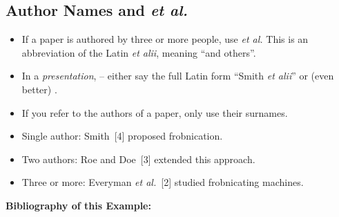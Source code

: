 \documentclass[11pt,a4paper]{article}
\begin{document}
\subsection{Author Names and \emph{et al.}}
\label{sec-author-names-et-al}

\begin{itemize}
    \item If a paper is authored by three or more people, use \emph{et al.} This is an abbreviation of the Latin \emph{et alii}, meaning ``and others''.
    \item In a \emph{presentation},  -- either say the full Latin form ``Smith \emph{et alii}'' or (even better) .
    \item If you refer to the authors of a paper, only use their surnames.
\end{itemize}

\begin{goodexample}
  \begin{NoHyper}
    \begin{itemize}[leftmargin=1em]
        \item Single author: Smith~[4] proposed frobnication.
        
        \item Two authors: Roe and Doe~[3] extended this approach.
        
        \item Three or more: Everyman \emph{et al.}~[2] studied frobnicating machines.
    \end{itemize}

    \pagebreak

    {\normalsize{}
    \textbf{Bibliography of this Example:}
    \vspace{1em}
    
    {\normalsize
        
        
    }
    }
  \end{NoHyper}
\end{goodexample}
\end{document}
